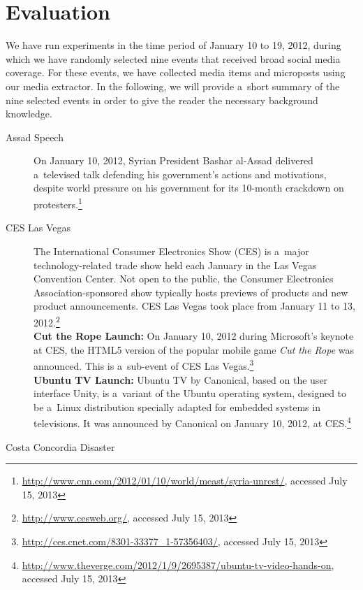 \section{Evaluation}

We have run experiments in the time period of January 10 to 19, 2012,
during which we have randomly selected nine events
that received broad social media coverage.
For these events, we have collected media items and microposts
using our media extractor.
In the following, we will provide a~short summary of the nine selected events
in order to give the reader the necessary background knowledge.

\begin{description}
  \item[Assad Speech]
       On January 10, 2012, Syrian President Bashar al-Assad
       delivered a~televised talk defending his
       government's actions and motivations, despite world
       pressure on his government for its 10-month
       crackdown on
       protesters.\footnote{\url{http://www.cnn.com/2012/01/10/world/meast/syria-unrest/},
       accessed July 15, 2013}
  \item[CES Las Vegas]
       The International Consumer Electronics Show (CES) is
       a~major technology-related trade show held each January
       in the Las Vegas Convention Center. Not open to the public,
       the Consumer Electronics Association-sponsored show
       typically hosts previews of products and new product
       announcements.
       CES Las Vegas took place from January 11 to 13,
       2012.\footnote{\url{http://www.cesweb.org/},
       accessed July 15, 2013}\\
       \textbf{Cut the Rope Launch:}
       On January 10, 2012 during Microsoft's keynote at CES, the
       HTML5 version of the popular mobile game \textit{Cut the
       Rope} was announced. This is a~sub-event of CES Las
       Vegas.\footnote{\url{http://ces.cnet.com/8301-33377_1-57356403/},
       accessed July 15, 2013}\\
       \textbf{Ubuntu TV Launch:}
       Ubuntu TV by Canonical, based on the user interface Unity,
       is a~variant of the Ubuntu operating system, designed to be
       a~Linux distribution specially adapted for embedded systems
       in televisions. It was announced by Canonical on January
       10, 2012, at
       CES.\footnote{\url{http://www.theverge.com/2012/1/9/2695387/ubuntu-tv-video-hands-on},
       accessed July 15, 2013}
  \item[Costa Concordia Disaster]

\end{description}
